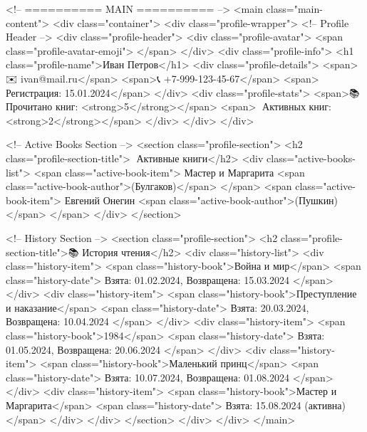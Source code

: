     <!-- ========== MAIN ========== -->
    <main class="main-content">
      <div class="container">
        <div class="profile-wrapper">
          <!-- Profile Header -->
          <div class="profile-header">
            <div class="profile-avatar">
              <span class="profile-avatar-emoji">👤</span>
            </div>
            <div class="profile-info">
              <h1 class="profile-name">Иван Петров</h1>
              <div class="profile-details">
                <span>✉️ ivan@mail.ru</span>
                <span>📞 +7-999-123-45-67</span>
                <span>📅 Регистрация: 15.01.2024</span>
              </div>
              <div class="profile-stats">
                <span>📚 Прочитано книг: <strong>5</strong></span>
                <span>📖 Активных книг: <strong>2</strong></span>
              </div>
            </div>
          </div>

          <!-- Active Books Section -->
          <section class="profile-section">
            <h2 class="profile-section-title">📖 Активные книги</h2>
            <div class="active-books-list">
              <span class="active-book-item">
                Мастер и Маргарита
                <span class="active-book-author">(Булгаков)</span>
              </span>
              <span class="active-book-item">
                Евгений Онегин
                <span class="active-book-author">(Пушкин)</span>
              </span>
            </div>
          </section>

          <!-- History Section -->
          <section class="profile-section">
            <h2 class="profile-section-title">📚 История чтения</h2>
            <div class="history-list">
              <div class="history-item">
                <span class="history-book">Война и мир</span>
                <span class="history-date">
                  Взята: 01.02.2024, Возвращена: 15.03.2024
                </span>
              </div>
              <div class="history-item">
                <span class="history-book">Преступление и наказание</span>
                <span class="history-date">
                  Взята: 20.03.2024, Возвращена: 10.04.2024
                </span>
              </div>
              <div class="history-item">
                <span class="history-book">1984</span>
                <span class="history-date">
                  Взята: 01.05.2024, Возвращена: 20.06.2024
                </span>
              </div>
              <div class="history-item">
                <span class="history-book">Маленький принц</span>
                <span class="history-date">
                  Взята: 10.07.2024, Возвращена: 01.08.2024
                </span>
              </div>
              <div class="history-item">
                <span class="history-book">Мастер и Маргарита</span>
                <span class="history-date">
                  Взята: 15.08.2024 (активна)
                </span>
              </div>
            </div>
          </section>
        </div>
      </div>
    </main>

